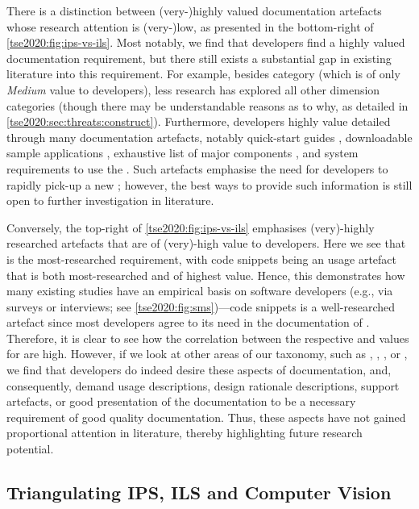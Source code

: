 There is a distinction between \mbox{(very-)highly} valued documentation artefacts whose research attention is \mbox{(very-)low}, as presented in the bottom-right of \cref{tse2020:fig:ips-vs-ils}. Most notably, we find that developers find \dimd{}  a highly valued  documentation requirement, but there still exists a substantial gap in existing literature into this requirement. For example, besides category  (which is of only \textit{Medium} value to developers), less research has explored all other dimension  categories (though there may be understandable reasons as to why, as detailed in \cref{tse2020:sec:threats:construct}). Furthermore, developers highly value detailed \dima{}  through many documentation artefacts, notably quick-start guides , downloadable sample applications , exhaustive list of major components , and system requirements to use the  . Such artefacts emphasise the need for developers to rapidly pick-up a new ; however, the best ways to provide such information is still open to further investigation in literature.

Conversely, the top-right of \cref{tse2020:fig:ips-vs-ils} emphasises (very)-highly researched artefacts that are of (very)-high value to developers. Here we see that \dima{}  is the most-researched requirement, with code snippets  being an  usage artefact that is both most-researched and of highest value. Hence, this demonstrates how many existing studies have an empirical basis on software developers (e.g., via surveys or interviews; see \cref{tse2020:fig:sms})---code snippets is a well-researched artefact since most developers agree to its need in the documentation of . Therefore, it is clear to see how the correlation between the respective  and  values for  are high. However, if we look at other areas of our taxonomy, such as ,  , ,  or , we find that developers do indeed desire these aspects of  documentation, and, consequently, demand usage descriptions, design rationale descriptions, support artefacts, or good presentation of the documentation to be a necessary requirement of good quality  documentation. Thus, these aspects have not gained proportional attention in literature, thereby highlighting future research potential.

\subsection{Triangulating IPS, ILS and Computer Vision}

